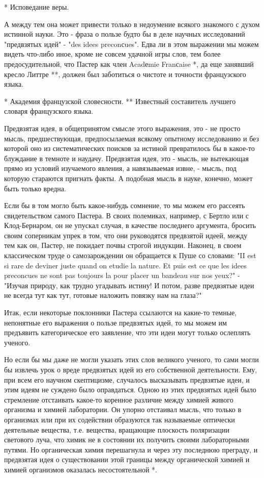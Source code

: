 * Исповедание веры.

А между тем она может привести  только в недоумение всякого знакомого  с
духом истинной  науки. Это  - фраза  о пользе  будто бы  в деле  научных
исследований "предвзятых идей" - "des idees preconсues". Едва ли в  этом
выражении мы можем видеть  что-либо иное, кроме  не совсем удачной  игры
слов,  тем  более  предосудительной,   что  Пастер  как  член   Acadеmie
Franсaise *, да еще занявший кресло  Литтре **, должен был заботиться  о
чистоте и точности французского языка.

* Академия французской словесности.
** Известный составитель лучшего словаря французского языка.

Предвзятая идея, в общепринятом смысле этого выражения, это - не  просто
мысль, предшествующая,  предпосылаемая всякому  опытному исследованию  и
без которой оно из систематических поисков за истиной превратилось бы  в
какое-то блуждание в темноте и наудачу. Предвзятая идея, это - мысль, не
вытекающая прямо из условий изучаемого явления, а навязываемая извне,  -
мысль, под которую стараются пригнать  факты. А подобная мысль в  науке,
конечно, может быть только вредна.

Если бы в том могло быть какое-нибудь сомнение, то мы можем его рассеять
свидетельством самого Пастера. В своих полемиках, например, с Бертло или
с Клод-Бернаром, он не упускал случая, в качестве последнего  аргумента,
бросить своим соперникам  упрек в  том, что  они руководятся  предвзятой
идеей, между тем  как он,  Пастер, не покидает  почвы строгой  индукции.
Наконец, в своем  классическом труде  о самозарождении  он обращается  к
Пуше со словами: "II  est si rare  de deviner juste  quand on etudie  la
nature. Et puis est ce que les idees preconcues ne sont pas toujours  la
pour placer un  bandeau sur  nos yeux?"  - "Изучая  природу, как  трудно
угадывать истину! И потом, разве предвзятые идеи не всегда тут как  тут,
готовые наложить повязку нам на глаза?"

Итак, если некоторые  поклонники Пастера ссылаются  на какие-то  темные,
непонятные его  выражения  о пользе  предвзятых  идей, то  мы  можем  им
предъявить категорическое  его  заявление,  что эти  идеи  могут  только
ослеплять ученого.

Но если бы мы даже не могли указать этих слов великого ученого, то  сами
могли бы  извлечь  урок  о  вреде предвзятых  идей  из  его  собственной
деятельности.  Ему,  при   всем  его   научном  скептицизме,   случалось
высказывать предвзятые идеи, и этим  идеям не суждено было  оправдаться.
Одною из  этих  предвзятых  идей  было  стремление  отстаивать  какое-то
коренное различие между химией живого организма и химией лаборатории. Он
упорно отстаивал мысль, что  только в организмах  или при их  содействии
образуются так называемые оптически деятельные вещества, т.е.  вещества,
вращающие плоскость поляризации светового луча, что химик не в состоянии
их  получить  своими   лабораторными  путями.   Но  органическая   химия
перешагнула  и  через  эту  последнюю  преграду,  и  предвзятая  идея  о
существовании этой границы между органической химией и химией организмов
оказалась несостоятельной *.

